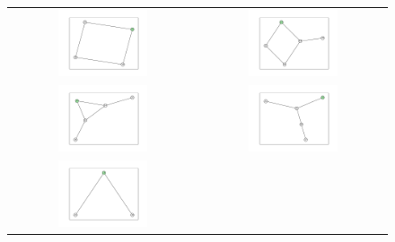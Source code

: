 \documentclass[12pt, a4paper]{extarticle}
\begin{document}
\begin{figure}\centering\begin{tabularx}{\textwidth}{cc}
\includegraphics[width=0.5\textwidth]{task11-graphlets/4_16-18-25-23.pdf} &
\includegraphics[width=0.5\textwidth]{task11-graphlets/5_16-18-25-19-23.pdf} \\
\includegraphics[width=0.5\textwidth]{task11-graphlets/5_16-25-22-23-24.pdf} &
\includegraphics[width=0.5\textwidth]{task11-graphlets/5_21-17-20-22-23.pdf} \\
\includegraphics[width=0.5\textwidth]{task11-graphlets/3_18-23-24.pdf} &

\end{tabularx}
\end{figure}
\end{document}
